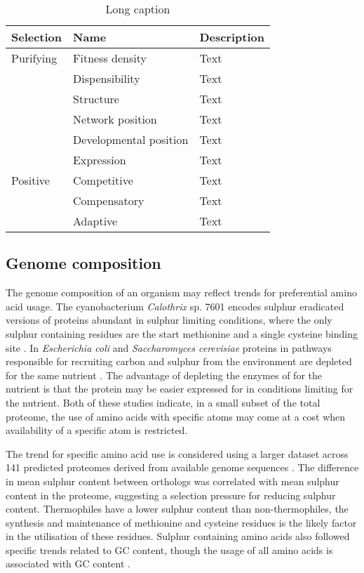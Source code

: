 \begin{table}
  \centering
  \begin{tabular}{ l l l }
  \toprule
  Selection & Name                   & Description \\ \midrule
  Purifying & Fitness density        & Text \\
            & Dispensibility         & Text \\
            & Structure              & Text \\
            & Network position       & Text \\
            & Developmental position & Text \\
            & Expression             & Text \\
  Positive  & Competitive            & Text \\
            & Compensatory           & Text \\
            & Adaptive               & Text \\ \bottomrule
  \end{tabular}
  \caption[Factors in protein evolution]{Long caption}
  \label{table:protein_selective_pressures}
\end{table}

\subsection{Genome composition}

The genome composition of an organism may reflect trends for preferential amino acid usage. The cyanobacterium \emph{Calothrix} sp. 7601 encodes sulphur eradicated versions of proteins abundant in sulphur limiting conditions, where the only sulphur containing residues are the start methionine and a single cysteine binding site \cite{mazel1989}. In \emph{Escherichia coli} and \emph{Saccharomyces cerevisiae} proteins in pathways responsible for recruiting carbon and sulphur from the environment are depleted for the same nutrient \cite{baudoin2001}. The advantage of depleting the enzymes of for the nutrient is that the protein may be easier expressed for in conditions limiting for the nutrient. Both of these studies indicate, in a small subset of the total proteome, the use of amino acids with specific atoms may come at a cost when availability of a specific atom is restricted.

The trend for specific amino acid use is considered using a larger dataset across 141 predicted proteomes derived from available genome sequences \cite{bragg2006}. The difference in mean sulphur content between orthologs was correlated with mean sulphur content in the proteome, suggesting a selection pressure for reducing sulphur content. Thermophiles have a lower sulphur content than non-thermophiles, the synthesis and maintenance of methionine and cysteine residues is the likely factor in the utilisation of these residues. Sulphur containing amino acids also followed specific trends related to GC content, though the usage of all amino acids is associated with GC content \cite{tekaia2006}.

